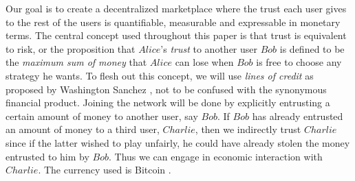 \documentclass[11pt]{llncs}
\makeatletter
\def\bitcoin{%
  \leavevmode
  \vtop{\offinterlineskip %
    \setbox0=\hbox{B}%
    \setbox2=\hbox to\wd0{\hfil\hskip-.03em
    \vrule height .3ex width .15ex\hskip .08em
    \vrule height .3ex width .15ex\hfil}
    \vbox{\copy2\box0}\box2}}
\newcommand\semihuge{\@setfontsize\semihuge{19.22}{23.88}}
\theoremstyle{definition}
\makeatother
\begin{document}
     Our goal is to create a decentralized marketplace where the trust each user gives to the rest of the users is
     quantifiable, measurable and expressable in monetary terms. The central concept used throughout this paper is
     that trust is equivalent to risk, or the proposition that $Alice$'s \textit{trust} to another user $Bob$ is defined to
     be the \textit{maximum sum of money} that $Alice$ can lose when $Bob$ is free to choose any strategy he wants. To flesh
     out this concept, we will use \textit{lines of credit} as proposed by Washington Sanchez \cite{loc}, not to be confused
     with the synonymous financial product. Joining the network
     will be done by explicitly entrusting a certain amount of money to another user, say $Bob$. If $Bob$ has already
     entrusted an amount of money to a third user, $Charlie$, then we indirectly trust $Charlie$ since if the latter wished
     to play unfairly, he could have already stolen the money entrusted to him by $Bob$. Thus we can engage in economic
     interaction with $Charlie$. The currency used is Bitcoin \cite{bitcoin}. \medskip \ \\
 \smallskip \ \\
\end{document}
